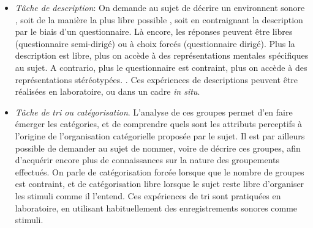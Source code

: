\begin{itemize}
\item \emph{Tâche de description}: On demande au sujet de décrire un environnent sonore \citep{axelsson2005soundscape,raimbault2005urban,guastavino2006ideal,raimbault2006qualitative}, soit de la manière la plus libre possible , soit en contraignant la description par le biais d'un questionnaire. Là encore, les réponses  peuvent être libres (questionnaire semi-dirigé) ou à choix forcés (questionnaire dirigé). Plus la description est libre, plus on accède à des représentations mentales spécifiques au sujet. A contrario, plus le questionnaire est contraint, plus on accède à des représentations stéréotypées. . Ces expériences de descriptions peuvent être réalisées en laboratoire, ou dans un cadre \emph{in situ}.

\item \emph{Tâche de tri ou catégorisation}.  L'analyse de ces groupes permet d'en faire émerger les catégories, et de comprendre quels sont les attributs perceptifs à l'origine de l'organisation catégorielle proposée par le sujet. Il est par ailleurs possible de demander au sujet de nommer, voire de décrire ces groupes, afin d'acquérir encore plus de connaissances sur la nature des groupements effectués. On parle de catégorisation forcée lorsque que le nombre de groupes est contraint, et de catégorisation libre lorsque le sujet reste libre d'organiser les stimuli comme il l'entend. Ces expériences de tri sont pratiquées en laboratoire, en utilisant habituellement des enregistrements sonores comme stimuli.
\end{itemize}

